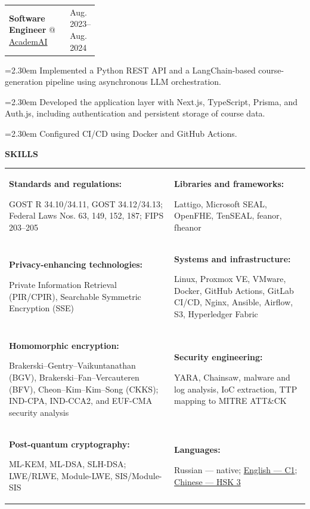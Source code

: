 \documentclass[11pt,a4paper]{article}
\makeatletter
\newcommand{\cvrow}[2]{%
  \noindent
  \begin{minipage}[t]{0.145\textwidth}
    \vspace{0pt}%
    \raggedright
    \fontsize{8.5}{10}\selectfont
    \bfseries\MakeUppercase{#1}
  \end{minipage}%
  \hfill
  \begin{minipage}[t]{0.835\textwidth}
    \vspace{0pt}%
    #2
  \end{minipage}\par
}
\newcommand{\skillcell}[2]{%
  \textbf{#1}\par
  #2
}
\newcommand{\workentry}[2]{%
  \noindent
  \begin{tabularx}{\linewidth}
    {@{}X@{\hspace{0.8em}}
    >{\raggedleft\arraybackslash}p{0.30\linewidth}@{}}
    #1 & \small #2
  \end{tabularx}\par
  \vspace{0.15em}
}
\newcommand{\workproject}[1]{%
  \noindent
  \hangindent=2.30em
  \hangafter=1
  \hspace*{1.15em}\makebox[1.15em][l]{$\diamond$}#1\par
  \vspace{0.12em}
}
\makeatother
\begin{document}
\vspace{0.50em}

\cvrow{}{%
  \workentry
    {\textbf{Software Engineer} @ \href{https://academai.ru/}{AcademAI}}
    {Aug. 2023--Aug. 2024}

  \workproject{Implemented a Python REST API and a LangChain-based course-generation
  pipeline using asynchronous LLM orchestration.}
  \workproject{Developed the application layer with Next.js, TypeScript, Prisma,
  and Auth.js, including authentication and persistent storage of course data.}
  \workproject{Configured CI/CD using Docker and GitHub Actions.}
}

\vspace{0.75em}

\cvrow{Skills}{%
  \begin{tabularx}{\linewidth}
    {@{}>{\raggedright\arraybackslash}X
    @{\hspace{1.2em}}
    >{\raggedright\arraybackslash}X@{}}

    \skillcell{Standards and regulations:}{%
      GOST R 34.10/34.11, GOST 34.12/34.13;
      Federal Laws Nos. 63, 149, 152, 187; FIPS 203--205}
    &
    \skillcell{Libraries and frameworks:}{%
      Lattigo, Microsoft SEAL, OpenFHE, TenSEAL,
      feanor, fheanor}
    \\[0.20em]

    \skillcell{Privacy-enhancing technologies:}{%
      Private Information Retrieval (PIR/CPIR),
      Searchable Symmetric Encryption (SSE)}
    &
    \skillcell{Systems and infrastructure:}{%
      Linux, Proxmox VE, VMware, Docker,
      GitHub Actions, GitLab CI/CD, Nginx, Ansible,
      Airflow, S3,
      Hyperledger Fabric}
    \\[0.20em]

    \skillcell{Homomorphic encryption:}{%
      Brakerski--Gentry--Vaikuntanathan (BGV),
      Brakerski--Fan--Vercauteren (BFV),
      Cheon--Kim--Kim--Song (CKKS);
      IND-CPA, IND-CCA2, and EUF-CMA security analysis}
    &
    \skillcell{Security engineering:}{%
      YARA, Chainsaw, malware and log analysis,
      IoC extraction, TTP mapping to MITRE ATT\&CK}
    \\[0.20em]

    \skillcell{Post-quantum cryptography:}{%
      ML-KEM, ML-DSA, SLH-DSA;
      LWE/RLWE, Module-LWE, SIS/Module-SIS}
    &
    \skillcell{Languages:}{%
      Russian --- native;
      \href{https://iasenovets.github.io/files/toefl_8cd5f4a2b8ec8f34da49ea0faeef43f1.pdf}{English --- C1};
      \href{https://admin.chinesetest.cn/queryScore.do?sid=c2tActR9Wb\%2704b861aefbdc5e9fd0b44afa717d08cbceb0720e582ce25f\%2724d7sWsQ5nVUQSwD}
        {Chinese --- HSK 3}}
  \end{tabularx}
}
\end{document}
